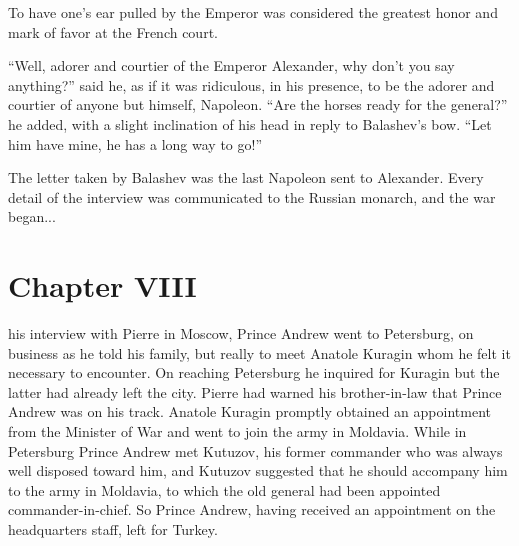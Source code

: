 To have one's ear pulled by the Emperor was considered the
greatest honor and mark of favor at the French court.

``Well, adorer and courtier of the Emperor Alexander, why don't
you say anything?'' said he, as if it was ridiculous, in his
presence, to be the adorer and courtier of anyone but himself,
Napoleon. ``Are the horses ready for the general?'' he added,
with a slight inclination of his head in reply to Balashev's
bow. ``Let him have mine, he has a long way to go!''

The letter taken by Balashev was the last Napoleon sent to
Alexander.  Every detail of the interview was communicated to the
Russian monarch, and the war began...


\chapter*{Chapter VIII}
\ifaudio     
{} 
\fi

 his interview with Pierre in Moscow, Prince Andrew went to
Petersburg, on business as he told his family, but really to meet
Anatole Kuragin whom he felt it necessary to encounter. On
reaching Petersburg he inquired for Kuragin but the latter had
already left the city. Pierre had warned his brother-in-law that
Prince Andrew was on his track. Anatole Kuragin promptly obtained
an appointment from the Minister of War and went to join the army
in Moldavia. While in Petersburg Prince Andrew met Kutuzov, his
former commander who was always well disposed toward him, and
Kutuzov suggested that he should accompany him to the army in
Moldavia, to which the old general had been appointed
commander-in-chief. So Prince Andrew, having received an
appointment on the headquarters staff, left for Turkey.


